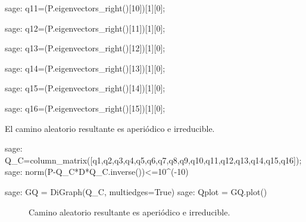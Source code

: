 \begin{sagecommandline}
    sage: q11=(P.eigenvectors_right()[10])[1][0];
\end{sagecommandline}

\begin{sagecommandline}
    sage: q12=(P.eigenvectors_right()[11])[1][0];
\end{sagecommandline}

\begin{sagecommandline}
    sage: q13=(P.eigenvectors_right()[12])[1][0];
\end{sagecommandline}

\begin{sagecommandline}
    sage: q14=(P.eigenvectors_right()[13])[1][0];
\end{sagecommandline}

\begin{sagecommandline}
    sage: q15=(P.eigenvectors_right()[14])[1][0];
\end{sagecommandline}

\begin{sagecommandline}
    sage: q16=(P.eigenvectors_right()[15])[1][0];
\end{sagecommandline}

\par El camino aleatorio resultante es aperiódico e irreducible.

\begin{sagecommandline}
    sage: Q_C=column_matrix([q1,q2,q3,q4,q5,q6,q7,q8,q9,q10,q11,q12,q13,q14,q15,q16]);
    sage: norm(P-Q_C*D*Q_C.inverse())<=10^(-10)
\end{sagecommandline}
\begin{sagecommandline}
    sage: GQ = DiGraph(Q_C, multiedges=True)
    sage: Qplot = GQ.plot()
\end{sagecommandline}
\begin{figure}[H]
    \centering
    \label{caminoZ_2}
    \caption{Camino aleatorio resultante es aperiódico e irreducible.}
\end{figure}

